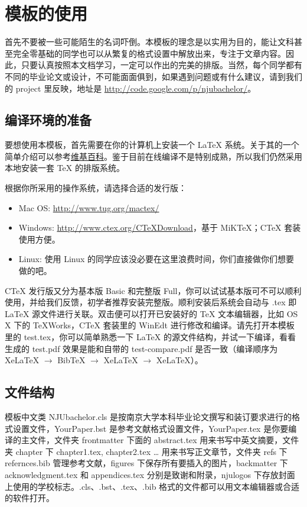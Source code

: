 \chapter{模板的使用}
首先不要被一些可能陌生的名词吓倒。本模板的理念是以实用为目的，能让文科甚至完全零基础的同学也可以从繁复的格式设置中解放出来，专注于文章内容。因此，只要认真按照本文档学习，一定可以作出的完美的排版。当然，每个同学都有不同的毕业论文或设计，不可能面面俱到，如果遇到问题或有什么建议，请到我们的 project 里反映，地址是 \url{http://code.google.com/p/njubachelor/}。

\section{编译环境的准备}
要想使用本模板，首先需要在你的计算机上安装一个 \LaTeX{} 系统。关于其的一个简单介绍可以参考\href{http://zh.wikipedia.org/wiki/Latex}{维基百科}。鉴于目前在线编译不是特别成熟，所以我们仍然采用本地安装一套 \TeX{} 的排版系统。

根据你所采用的操作系统，请选择合适的发行版：
\begin{itemize}
	\item Mac OS: \url{http://www.tug.org/mactex/}
	\item Windows: \url{http://www.ctex.org/CTeXDownload}，基于 MiKTeX；CTeX 套装使用方便。
	\item Linux: 使用 Linux 的同学应该没必要在这里浪费时间，你们直接做你们想要做的吧。
\end{itemize}
CTeX 发行版又分为基本版 Basic 和完整版 Full，你可以试试基本版可不可以顺利使用，并给我们反馈，初学者推荐安装完整版。顺利安装后系统会自动与 .tex 即 \LaTeX{} 源文件进行关联。双击便可以打开已安装好的 \TeX{} 文本编辑器，比如 OS X 下的 TeXWorks，CTeX 套装里的 WinEdt 进行修改和编译。请先打开本模板里的 test.tex，你可以简单熟悉一下 \LaTeX{} 的源文件结构，并试一下编译，看看生成的 test.pdf 效果是能和自带的 test-compare.pdf 是否一致（编译顺序为 XeLaTeX $\rightarrow$ BibTeX $\rightarrow$ XeLaTeX $\rightarrow$ XeLaTeX）。

\section{文件结构}
模板中文类 NJUbachelor.cls 是按南京大学本科毕业论文撰写和装订要求进行的格式设置文件，YourPaper.bst 是参考文献格式设置文件，YourPaper.tex 是你要编译的主文件，文件夹 frontmatter 下面的 abstract.tex 用来书写中英文摘要，文件夹 chapter 下 chapter1.tex, chapter2.tex … 用来书写正文章节，文件夹 refs 下 refernces.bib 管理参考文献，figures 下保存所有要插入的图片，backmatter 下 acknowledgment.tex 和 appendices.tex 分别是致谢和附录，njulogos 下存放封面上使用的学校标志。.cls、.bst、.tex、.bib 格式的文件都可以用文本编辑器或合适的软件打开。


